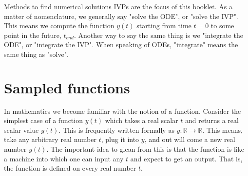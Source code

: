 \documentclass[hidelinks,notitlepage]{book}
\begin{document}
Methods to find numerical solutions IVPs are the focus of this booklet.  As a matter of nomenclature, we generally say "solve the ODE", or "solve the IVP".  This means we compute the function $y(t)$ starting from time $t=0$ to some point in the future, $t_{end}$.  Another way to say the same thing is we "integrate the ODE", or "integrate the IVP".  When speaking of ODEs, "integrate" means the same thing as "solve".

\section{Sampled functions}
In mathematics we become familiar with the notion of a function.  Consider the simplest case of a function $y(t)$ which takes a real scalar $t$ and returns a real scalar value $y(t)$.  This is frequently written formally as $y:\mathbb{R}\rightarrow \mathbb{R}$.  This means, take any arbitrary real number $t$, plug it into $y$, and out will come a new real number $y(t)$.  The important idea to glean from this is that the function is like a machine into which one can input any $t$ and expect to get an output.  That is, the function is defined on every real number $t$.
\end{document}
